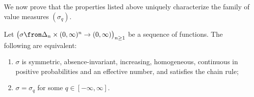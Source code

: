 We now prove that the properties listed above uniquely characterize the
family of value measures $(\sigma_q)$.

\begin{thm}
% 
Let $\bigl( \sigma \from \Delta_n \times (0, \infty)^n \to (0, \infty)
\bigr)_{n \geq 1}$ be a sequence of functions.  The following are
equivalent: 
% 
\begin{enumerate}
\item 
{}
$\sigma$ is symmetric, absence-invariant, increasing, homogeneous,
continuous in positive probabilities and an effective number, and satisfies
the chain rule;

\item
{}
$\sigma = \sigma_q$ for some $q \in [-\infty, \infty]$. 
\end{enumerate}
\end{thm}

